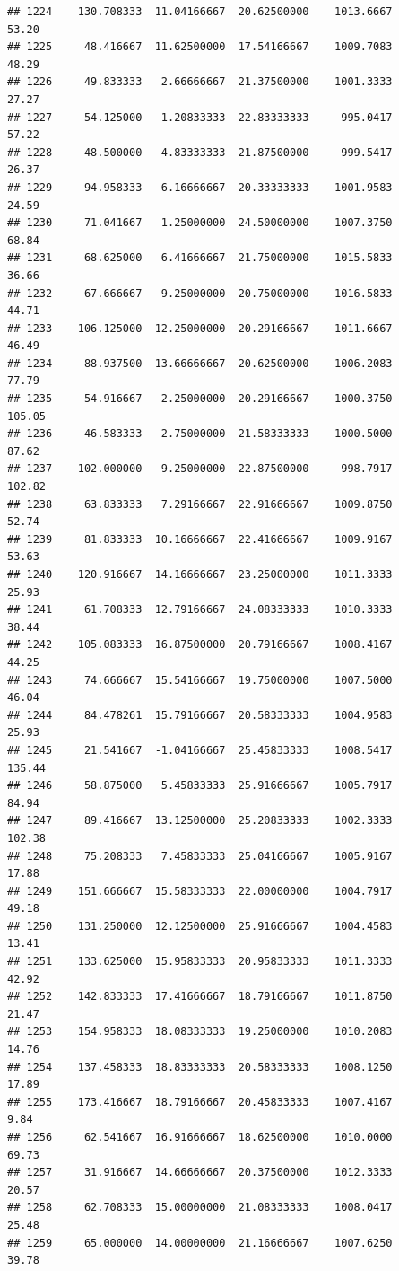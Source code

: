 \documentclass[
]{article}
\begin{document}
\begin{verbatim}
## 1224    130.708333  11.04166667  20.62500000    1013.6667       53.20
## 1225     48.416667  11.62500000  17.54166667    1009.7083       48.29
## 1226     49.833333   2.66666667  21.37500000    1001.3333       27.27
## 1227     54.125000  -1.20833333  22.83333333     995.0417       57.22
## 1228     48.500000  -4.83333333  21.87500000     999.5417       26.37
## 1229     94.958333   6.16666667  20.33333333    1001.9583       24.59
## 1230     71.041667   1.25000000  24.50000000    1007.3750       68.84
## 1231     68.625000   6.41666667  21.75000000    1015.5833       36.66
## 1232     67.666667   9.25000000  20.75000000    1016.5833       44.71
## 1233    106.125000  12.25000000  20.29166667    1011.6667       46.49
## 1234     88.937500  13.66666667  20.62500000    1006.2083       77.79
## 1235     54.916667   2.25000000  20.29166667    1000.3750      105.05
## 1236     46.583333  -2.75000000  21.58333333    1000.5000       87.62
## 1237    102.000000   9.25000000  22.87500000     998.7917      102.82
## 1238     63.833333   7.29166667  22.91666667    1009.8750       52.74
## 1239     81.833333  10.16666667  22.41666667    1009.9167       53.63
## 1240    120.916667  14.16666667  23.25000000    1011.3333       25.93
## 1241     61.708333  12.79166667  24.08333333    1010.3333       38.44
## 1242    105.083333  16.87500000  20.79166667    1008.4167       44.25
## 1243     74.666667  15.54166667  19.75000000    1007.5000       46.04
## 1244     84.478261  15.79166667  20.58333333    1004.9583       25.93
## 1245     21.541667  -1.04166667  25.45833333    1008.5417      135.44
## 1246     58.875000   5.45833333  25.91666667    1005.7917       84.94
## 1247     89.416667  13.12500000  25.20833333    1002.3333      102.38
## 1248     75.208333   7.45833333  25.04166667    1005.9167       17.88
## 1249    151.666667  15.58333333  22.00000000    1004.7917       49.18
## 1250    131.250000  12.12500000  25.91666667    1004.4583       13.41
## 1251    133.625000  15.95833333  20.95833333    1011.3333       42.92
## 1252    142.833333  17.41666667  18.79166667    1011.8750       21.47
## 1253    154.958333  18.08333333  19.25000000    1010.2083       14.76
## 1254    137.458333  18.83333333  20.58333333    1008.1250       17.89
## 1255    173.416667  18.79166667  20.45833333    1007.4167        9.84
## 1256     62.541667  16.91666667  18.62500000    1010.0000       69.73
## 1257     31.916667  14.66666667  20.37500000    1012.3333       20.57
## 1258     62.708333  15.00000000  21.08333333    1008.0417       25.48
## 1259     65.000000  14.00000000  21.16666667    1007.6250       39.78

\end{verbatim}
\end{document}
